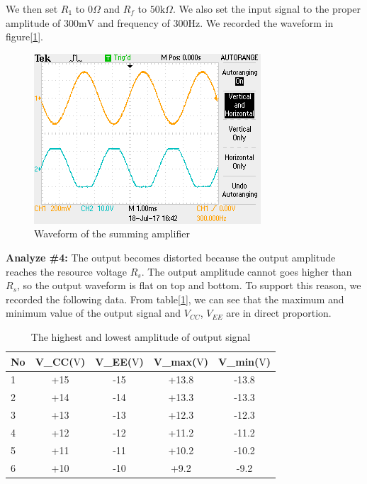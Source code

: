 \phantom{ } We then set $ R_1 $ to $ 0\si{\Omega} $ and $ R_f $ to $ 50\si{\kilo\Omega} $. We also set the input signal to the proper amplitude of 300$ \si{\milli\volt} $ and frequency of $ 300\si{\hertz} $. We recorded the waveform in figure[\ref{fig:108}].
\begin{figure}[!htbp]
	\centering 
	\begin{framed}
		\includegraphics[width=\linewidth]{images/osc2.png}
		\caption{Waveform of the summing amplifier}
		\label{fig:108} 
	\end{framed}
\end{figure} 

\textbf{Analyze \#4:} \newline
\phantom{ } The output becomes distorted because the output amplitude reaches the resource voltage $ R_s $. The output amplitude cannot goes higher than $ R_s $, so the output waveform is flat on top and bottom. To support this reason, we recorded the following data. From table[\ref{tab:distort}], we can see that the maximum and minimum value of the output signal and $ V_{CC} $, $ V_{EE} $ are in direct proportion.
\begin{table}[!htbp]
	\centering
	\caption{The highest and lowest amplitude of output signal}
	\begin{tabular}{lcccc}
		\toprule
		No &V\_CC($ \si{\volt} $) &V\_EE($ \si{\volt} $)&V\_max($ \si{\volt} $)&V\_min($ \si{\volt} $)\\
		\midrule
		1	&+15	&-15	&+13.8	&-13.8	\\
		2	&+14	&-14	&+13.3	&-13.3	\\
		3	&+13	&-13	&+12.3	&-12.3	\\
		4	&+12	&-12	&+11.2	&-11.2	\\
		5	&+11	&-11	&+10.2	&-10.2	\\
		6	&+10	&-10	&+9.2	&-9.2	\\
		\bottomrule
	\end{tabular}
	\label{tab:distort}
\end{table}

